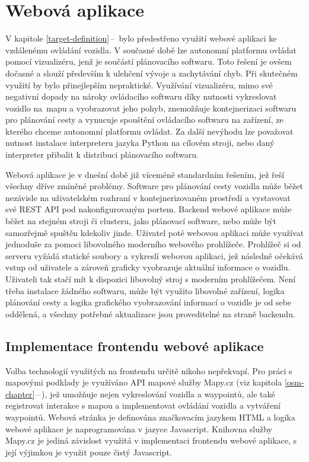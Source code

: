 \documentclass[czech, bachelor]{diploma}
\newcommand{\filipref}[1]{\ref{#1}\,--\,\nameref{#1}}
\begin{document}
\chapter{Webová aplikace} \label{web-app}

V kapitole \filipref{target-definition} bylo předestřeno využití webové aplikaci ke vzdálenému ovládání vozidla. V současné době
lze autonomní platformu ovládat pomocí vizualizéru, jenž je součástí plánovacího softwaru. Toto řešení je ovšem dočasné a slouží
především k ulehčení vývoje a zachytávání chyb. Při skutečném využití by bylo přinejlepším nepraktické. Využívání vizualizéru,
mimo své negativní dopady na nároky ovládacího softwaru díky nutnosti vykreslovat vozidlo na~mapu a vyobrazovat jeho pohyb,
znemožňuje kontejnerizaci softwaru pro plánování cesty a vynucuje spouštění ovládacího softwaru na zařízení, ze kterého chceme
autonomní platformu ovládat. Za další nevýhodu lze považovat nutnost instalace interpreteru jazyka Python na cílovém stroji, nebo
daný interpreter přibalit k distribuci plánovacího softwaru.

Webová aplikace je v dnešní době již víceméně standardním řešením, jež řeší všechny dříve zmíněné problémy. Software pro plánování
cesty vozidla může běžet nezávisle na uživatelském rozhraní v kontejnerizovaném prostředí a vystavovat své REST API
pod nakonfigurovaným portem. Backend webové aplikace může běžet na stejném stroji či clusteru, jako plánovací software, nebo může
být samozřejmě spuštěn kdekoliv jinde. Uživatel poté webovou aplikaci může využívat jednoduše za pomoci libovolného moderního
webového prohlížeče. Prohlížeč si od serveru vyžádá statické soubory a vykreslí webovou aplikaci, jež následně očekává vstup
od uživatele a zároveň graficky vyobrazuje aktuální informace o vozidlu. Uživateli tak stačí mít k dispozici libovolný stroj
s moderním prohlížečem. Není třeba instalace žádného softwaru, může být využito libovolné zařízení, logika plánování cesty
a logika grafického vyobrazování informací o vozidle je od sebe oddělená, a všechny potřebné aktualizace jsou proveditelné
na straně backendu.

\section{Implementace frontendu webové aplikace}

Volba technologií využitých na frontendu určitě nikoho nepřekvapí. Pro práci s mapovými podklady je využíváno API mapové služby
Mapy.cz (viz kapitola \filipref{osm-chapter}), jež umožňuje nejen vykreslování vozidla a waypointů, ale také registrovat interakce
s mapou a implementovat ovládání vozidla a vytváření waypointů. Webová stránka je definována značkovacím jazykem HTML a logika
webové aplikace je naprogramována v jazyce Javascript. Knihovna služby Mapy.cz je jediná závislost využitá v implementaci
frontendu webové aplikace, s její výjimkou je využit pouze čistý Javascript.
\end{document}
